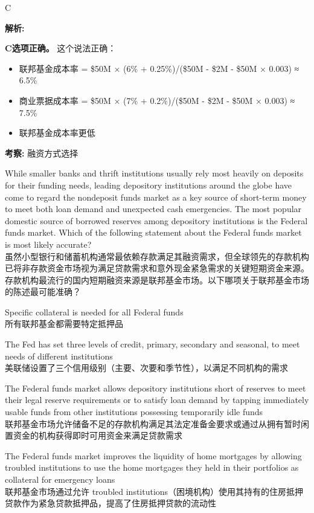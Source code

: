 \documentclass{article}
\newcounter{question} %
\newenvironment{explanation}
{\textbf{解析:}\par}
{\par}
\newcommand{\checklist}[1]{
    \textbf{考察:} #1 \par %
    \addcontentsline{toc}{subsection}{题号\thequestion 考察: #1} %
    \vspace{2em} %
}
\begin{document}
\begin{correctanswer}
    C
\end{correctanswer}

\begin{explanation}
    \textbf{C选项正确。}
    这个说法正确：
    \begin{itemize}
        \item 联邦基金成本率 = \$50M × (6\% + 0.25\%)/(\$50M - \$2M - \$50M × 0.003) ≈ 6.5\%
        \item 商业票据成本率 = \$50M × (7\% + 0.2\%)/(\$50M - \$2M - \$50M × 0.003) ≈ 7.5\%
        \item 联邦基金成本率更低
    \end{itemize}
\end{explanation}

\checklist{融资方式选择}


\begin{question}
    While smaller banks and thrift institutions usually rely most heavily on deposits for their funding needs, leading depository institutions around the globe have come to regard the nondeposit funds market as a key source of short-term money to meet both loan demand and unexpected cash emergencies. The most popular domestic source of borrowed reserves among depository institutions is the Federal funds market. Which of the following statement about the Federal funds market is most likely accurate?\\
    虽然小型银行和储蓄机构通常最依赖存款满足其融资需求，但全球领先的存款机构已将非存款资金市场视为满足贷款需求和意外现金紧急需求的关键短期资金来源。存款机构最流行的国内短期融资来源是联邦基金市场。以下哪项关于联邦基金市场的陈述最可能准确？
\end{question}

\begin{choices}
    \item Specific collateral is needed for all Federal funds\\
    所有联邦基金都需要特定抵押品
    \item The Fed has set three levels of credit, primary, secondary and seasonal, to meet needs of different institutions\\
    美联储设置了三个信用级别（主要、次要和季节性），以满足不同机构的需求
    \item The Federal funds market allows depository institutions short of reserves to meet their legal reserve requirements or to satisfy loan demand by tapping immediately usable funds from other institutions possessing temporarily idle funds\\
    联邦基金市场允许储备不足的存款机构满足其法定准备金要求或通过从拥有暂时闲置资金的机构获得即时可用资金来满足贷款需求
    \item The Federal funds market improves the liquidity of home mortgages by allowing troubled institutions to use the home mortgages they held in their portfolios as collateral for emergency loans\\
    联邦基金市场通过允许 troubled institutions（困境机构）使用其持有的住房抵押贷款作为紧急贷款抵押品，提高了住房抵押贷款的流动性
\end{choices}
\end{document}
